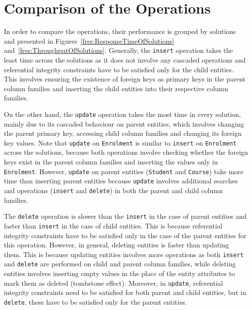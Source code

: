 \section{Comparison of the Operations} \label{s:comparisonOfOperations}
 
In order to compare the operations,  their performance  is grouped by solutions
and presented in Figures~\ref{fres:ResponseTimeOfSolutions}
and~\ref{fres:ThroughputOfSolutions}. 
Generally,  the \texttt{insert} operation takes the least time across the
solutions as it does not involve any cascaded operations and referential
integrity constraints have to be satisfied only for the child entities.  This
involves ensuring the existence of foreign keys as primary keys in the parent
column families and  inserting the child entities into their respective
column families. 

On the other hand,   the \texttt{update} operation takes the most time  in every
solution,   mainly due to its cascaded behaviour on parent entities,   which
involves changing the parent primary key,   accessing child column families and
changing its foreign key values.  Note that \texttt{update} on \texttt{Enrolment}
is similar to \texttt{insert} on \texttt{Enrolment} across the solutions, 
because both operations involve checking whether the foreign keys exist in the
parent column families and inserting the values only in \texttt{Enrolment}. 
However,   \texttt{update} on parent entities (\texttt{Student} and
\texttt{Course})  take more time than inserting parent entities because
\texttt{update} involves additional searches and operations (\texttt{insert} and
\texttt{delete}) in both the parent and child column families. 

The \texttt{delete} operation is slower than the \texttt{insert} in the case of
parent entities and faster than \texttt{insert} in the case of child entities. 
This is because  referential integrity constraints have to be satisfied only in
the case of the  parent entities for this operation. 
However,  in general,  deleting entities is faster than
updating them.  This is because updating entities involves more operations as
both \texttt{insert} and \texttt{delete} are performed on  child and
parent column families,  while deleting entities involves inserting empty values
in the place of the entity attributes to mark them as deleted (tombstone
effect).  Moreover,  in \texttt{update},  referential integrity constraints
need to be  satisfied for both parent and child entities,  but in
\texttt{delete},  these have to be satisfied only for the parent entities. 

